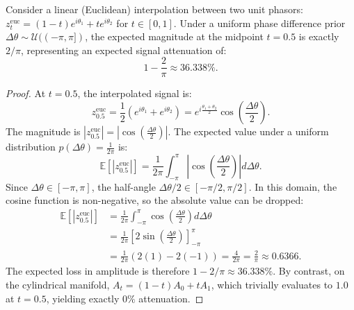 \begin{proposition}
\label{prop:attenuation_proof}
Consider a linear (Euclidean) interpolation between two unit phasors: $z_t^{\mathrm{euc}} = (1-t)e^{i\theta_1} + t e^{i\theta_2}$ for $t \in [0, 1]$. Under a uniform phase difference prior $\Delta\theta \sim \mathcal{U}((-\pi, \pi])$, the expected magnitude at the midpoint $t=0.5$ is exactly $2/\pi$, representing an expected signal attenuation of:
\begin{equation}
    1 - \frac{2}{\pi} \approx 36.338\%.
\end{equation}
\end{proposition}
\begin{proof}
At $t=0.5$, the interpolated signal is:
\begin{equation}
    z_{0.5}^{\mathrm{euc}} = \frac{1}{2} (e^{i\theta_1} + e^{i\theta_2}) = e^{i\frac{\theta_1+\theta_2}{2}} \cos\left(\frac{\Delta\theta}{2}\right).
\end{equation}
The magnitude is $|z_{0.5}^{\mathrm{euc}}| = \left|\cos\left(\frac{\Delta\theta}{2}\right)\right|$. The expected value under a uniform distribution $p(\Delta\theta) = \frac{1}{2\pi}$ is:
\begin{equation}
    \mathbb{E}\left[|z_{0.5}^{\mathrm{euc}}|\right] = \frac{1}{2\pi} \int_{-\pi}^\pi \left|\cos\left(\frac{\Delta\theta}{2}\right)\right| d\Delta\theta.
\end{equation}
Since $\Delta\theta \in [-\pi, \pi]$, the half-angle $\Delta\theta/2 \in [-\pi/2, \pi/2]$. In this domain, the cosine function is non-negative, so the absolute value can be dropped:
\begin{align}
    \mathbb{E}\left[|z_{0.5}^{\mathrm{euc}}|\right] &= \frac{1}{2\pi} \int_{-\pi}^\pi \cos\left(\frac{\Delta\theta}{2}\right) d\Delta\theta \\
    &= \frac{1}{2\pi} \left[ 2\sin\left(\frac{\Delta\theta}{2}\right) \right]_{-\pi}^\pi \\
    &= \frac{1}{2\pi} \left( 2(1) - 2(-1) \right) = \frac{4}{2\pi} = \frac{2}{\pi} \approx 0.6366.
\end{align}
The expected loss in amplitude is therefore $1 - 2/\pi \approx 36.338\%$. By contrast, on the cylindrical manifold, $A_t = (1-t)A_0 + tA_1$, which trivially evaluates to $1.0$ at $t=0.5$, yielding exactly $0\%$ attenuation.
\end{proof}


